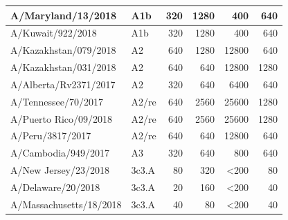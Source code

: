 \begin{table}[htbp]
\begin{tabular}{|p{11em}|p{3em}|r|r|p{5em}|r|}
    \midrule
    A/Maryland/13/2018 & \cellcolor[rgb]{ .678,  .839,  .416}A1b & 320   & 1280  & \multicolumn{1}{r|}{400} & 640 \\
    \midrule
    A/Kuwait/922/2018 & \cellcolor[rgb]{ .678,  .839,  .416}A1b & 320   & 1280  & \multicolumn{1}{r|}{400} & 640 \\
    A/Kazakhstan/079/2018 & \cellcolor[rgb]{ .996,  .733,  .263}A2 & 640   & 1280  & \multicolumn{1}{r|}{12800} & 640 \\
    \midrule
    A/Kazakhstan/031/2018 & \cellcolor[rgb]{ .996,  .733,  .263}A2 & 640   & 640   & \multicolumn{1}{r|}{12800} & 1280 \\
    \midrule
    A/Alberta/Rv2371/2017 & \cellcolor[rgb]{ .996,  .733,  .263}A2 & 320   & 640   & \multicolumn{1}{r|}{6400} & 640 \\
    \midrule
    A/Tennessee/70/2017 & \cellcolor[rgb]{ 1,  .6,  .231}A2/re & 640   & 2560  & \multicolumn{1}{r|}{25600} & 1280 \\
    \midrule
    A/Puerto Rico/09/2018 & \cellcolor[rgb]{ 1,  .6,  .231}A2/re & 640   & 2560  & \multicolumn{1}{r|}{25600} & 1280 \\
    \midrule
    A/Peru/3817/2017 & \cellcolor[rgb]{ 1,  .6,  .231}A2/re & 640   & 640   & \multicolumn{1}{r|}{12800} & 640 \\
    A/Cambodia/949/2017 & \cellcolor[rgb]{ 1,  .412,  .2}A3 & 320   & 640   & \multicolumn{1}{r|}{800} & 640 \\
    A/New Jersey/23/2018 & \cellcolor[rgb]{ .38,  .702,  .788}3c3.A & 80    & 320   & \multicolumn{1}{r|}{\textless200}  & 80 \\
    \midrule
    A/Delaware/20/2018 & \cellcolor[rgb]{ .38,  .702,  .788}3c3.A & 20    & 160   & \multicolumn{1}{r|}{\textless200}  & 40 \\
    \midrule
    A/Massachusetts/18/2018 & \cellcolor[rgb]{ .38,  .702,  .788}3c3.A & 40    & 80    & \multicolumn{1}{r|}{\textless200}  & 40 \\
    \bottomrule
    \end{tabular}%
  \label{sup_tab:titer_table}%
\end{table}%


